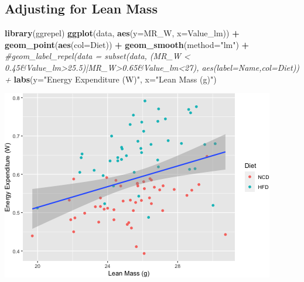 \documentclass[]{article}
\newenvironment{Shaded}{\begin{snugshade}}{\end{snugshade}}
\newcommand{\CommentTok}[1]{\textcolor[rgb]{0.56,0.35,0.01}{\textit{#1}}}
\newcommand{\DataTypeTok}[1]{\textcolor[rgb]{0.13,0.29,0.53}{#1}}
\newcommand{\KeywordTok}[1]{\textcolor[rgb]{0.13,0.29,0.53}{\textbf{#1}}}
\newcommand{\NormalTok}[1]{#1}
\newcommand{\OperatorTok}[1]{\textcolor[rgb]{0.81,0.36,0.00}{\textbf{#1}}}
\newcommand{\StringTok}[1]{\textcolor[rgb]{0.31,0.60,0.02}{#1}}
\begin{document}
\hypertarget{adjusting-for-lean-mass}{%
\subsection{Adjusting for Lean Mass}\label{adjusting-for-lean-mass}}

\begin{Shaded}
\begin{Highlighting}[]
\KeywordTok{library}\NormalTok{(ggrepel)}
\KeywordTok{ggplot}\NormalTok{(data, }\KeywordTok{aes}\NormalTok{(}\DataTypeTok{y=}\NormalTok{MR_W,}
           \DataTypeTok{x=}\NormalTok{Value_lm)) }\OperatorTok{+}
\StringTok{  }\KeywordTok{geom_point}\NormalTok{(}\KeywordTok{aes}\NormalTok{(}\DataTypeTok{col=}\NormalTok{Diet)) }\OperatorTok{+}
\StringTok{  }\KeywordTok{geom_smooth}\NormalTok{(}\DataTypeTok{method=}\StringTok{"lm"}\NormalTok{) }\OperatorTok{+}
\StringTok{  }\CommentTok{#geom_label_repel(data = subset(data, (MR_W < 0.45&Value_lm>25.5)|MR_W>0.65&Value_lm<27), aes(label=Name,col=Diet)) +}
\StringTok{  }\KeywordTok{labs}\NormalTok{(}\DataTypeTok{y=}\StringTok{"Energy Expenditure (W)"}\NormalTok{,}
       \DataTypeTok{x=}\StringTok{"Lean Mass (g)"}\NormalTok{)}
\end{Highlighting}
\end{Shaded}

\includegraphics{figures/lean-mass-adjusting-1.png}
\end{document}
